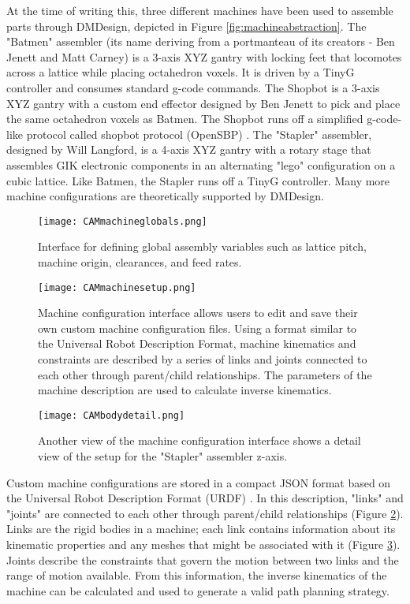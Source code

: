 {At the time of writing this, three different machines have been used to assemble parts through DMDesign, depicted in Figure \ref{fig:machineabstraction}.  The "Batmen" assembler (its name deriving from a portmanteau of its creators - Ben Jenett and Matt Carney) is a 3-axis XYZ gantry with locking feet that locomotes across a lattice while placing octahedron voxels.  It is driven by a TinyG controller \cite{Synthetos2016} and consumes standard g-code commands.  The Shopbot is a 3-axis XYZ gantry with a custom end effector designed by Ben Jenett to pick and place the same octahedron voxels as Batmen.  The Shopbot runs off a simplified g-code-like protocol called shopbot protocol (OpenSBP) \cite{Shopbot2016}.  The "Stapler" assembler, designed by Will Langford, is a 4-axis XYZ gantry with a rotary stage that assembles GIK electronic components in an alternating "lego" configuration on a cubic lattice.  Like Batmen, the Stapler runs off a TinyG controller.  Many more machine configurations are theoretically supported by DMDesign.\\

\begin{figure}
  \texttt{[image: CAMmachineglobals.png]}
  \caption{Interface for defining global assembly variables such as lattice pitch, machine origin, clearances, and feed rates.}
  \label{fig:CAMmachineglobals}
\end{figure}

\begin{figure}
  \texttt{[image: CAMmachinesetup.png]}
  \caption{Machine configuration interface allows users to edit and save their own custom machine configuration files.  Using a format similar to the Universal Robot Description Format, machine kinematics and constraints are described by a series of links and joints connected to each other through parent/child relationships.  The parameters of the machine description are used to calculate inverse kinematics.}
  \label{fig:CAMmachinesetup}
\end{figure}

\begin{figure}
  \texttt{[image: CAMbodydetail.png]}
  \caption{Another view of the machine configuration interface shows a detail view of the setup for the "Stapler" assembler z-axis.}
  \label{fig:CAMbodydetail}
\end{figure}

Custom machine configurations are stored in a compact JSON format based on the Universal Robot Description Format (URDF) \cite{ROS2016}.  In this description, "links" and "joints" are connected to each other through parent/child relationships (Figure \ref{fig:CAMmachinesetup}).  Links are the rigid bodies in a machine; each link contains information about its kinematic properties and any meshes that might be associated with it (Figure \ref{fig:CAMbodydetail}).  Joints describe the constraints that govern the motion between two links and the range of motion available.  From this information, the inverse kinematics of the machine can be calculated and used to generate a valid path planning strategy.\\

}
